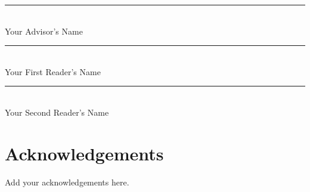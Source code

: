 \documentclass[12pt, oneside]{book2}
\newcommand{\thesisAdvisor}{Your Advisor's Name}
\newcommand{\thesisFirstReader}{Your First Reader's Name}
\newcommand{\thesisSecondReader}{Your Second Reader's Name}
\begin{document}
\begin{titlepage}
\begin{center}
    \vspace{1.5cm}

    \rule[-0.1cm]{8cm}{0.01cm} \\
    \thesisAdvisor \\

    \vspace{1.0cm}

    \rule[-0.1cm]{8cm}{0.01cm} \\
    \thesisFirstReader \\

    \vspace{1.0cm}

    \rule[-0.1cm]{8cm}{0.01cm} \\
    \thesisSecondReader \\

\end{center}
\thispagestyle{empty}
\end{titlepage}

\singlespacing
\setcounter{page}{3}

\tableofcontents
\setcounter{tocdepth}{2}
\cleardoublepage

\listoftables
\cleardoublepage

\listoffigures

\newpage

\chapter{Acknowledgements}

\noindent
Add your acknowledgements here.

\mainmatter










\appendix


\backmatter



\end{document}
